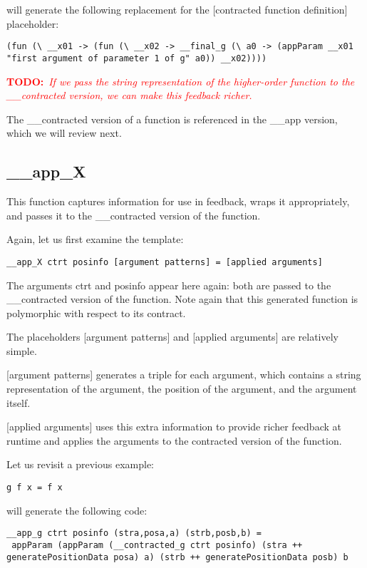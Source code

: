 \documentclass[10pt,a4paper]{article}
\newcommand{\annotate}[3]{
	\begin{scriptsize}
	\textcolor{#1}{\textbf{#2}~\textit{#3}}
	\end{scriptsize}\newline}
\newcommand{\todo}[1]{\annotate{red} {TODO:} {#1}}
\begin{document}
will generate the following replacement for the [contracted function definition] placeholder:

\begin{lstlisting}
(fun (\ __x01 -> (fun (\ __x02 -> __final_g (\ a0 -> (appParam __x01 "first argument of parameter 1 of g" a0)) __x02))))
\end{lstlisting}

\todo{If we pass the string representation of the higher-order function to the \_\_contracted version, we can make this feedback richer.}

The \_\_contracted version of a function is referenced in the \_\_app version, which we will review next.

\subsection{\_\_app\_X}

This function captures information for use in feedback, wraps it appropriately, and passes it to the \_\_contracted version of the function.

Again, let us first examine the template:

\begin{lstlisting}
__app_X ctrt posinfo [argument patterns] = [applied arguments]
\end{lstlisting}

The arguments ctrt and posinfo appear here again: both are passed to the \_\_contracted version of the function. Note again that this generated function is polymorphic with respect to its contract.

The placeholders [argument patterns] and [applied arguments] are relatively simple.

[argument patterns] generates a triple for each argument, which contains a string representation of the argument, the position of the argument, and the argument itself.

[applied arguments] uses this extra information to provide richer feedback at runtime and applies the arguments to the contracted version of the function.

Let us revisit a previous example:

\begin{lstlisting}
g f x = f x
\end{lstlisting}

will generate the following code:
\begin{lstlisting}
__app_g ctrt posinfo (stra,posa,a) (strb,posb,b) =
 appParam (appParam (__contracted_g ctrt posinfo) (stra ++ generatePositionData posa) a) (strb ++ generatePositionData posb) b
\end{lstlisting}
\end{document}
